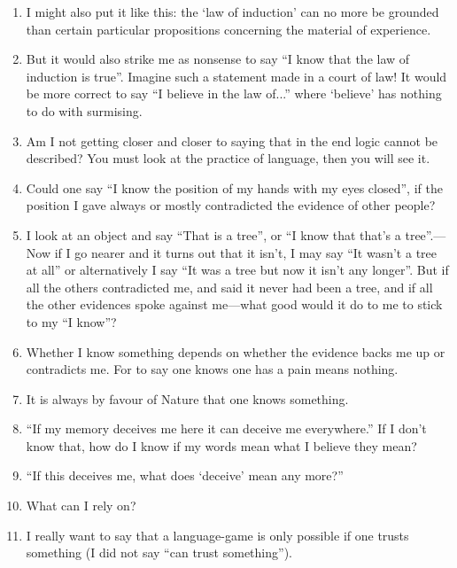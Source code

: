 \documentclass{book}
\begin{document}
\begin{enumerate}
\item
I might also put it like this: the `law of induction' can no more be grounded
than certain particular propositions concerning the material of experience.

\item
But it would also strike me as nonsense to say ``I know that the law of
induction is true''.  Imagine such a statement made in a court of law! It would
be more correct to say ``I believe in the law of...'' where `believe' has
nothing to do with surmising.

\item
Am I not getting closer and closer to saying that in the end logic cannot be
described? You must look at the practice of language, then you will see it.

\item
Could one say ``I know the position of my hands with my eyes closed'', if the
position I gave always or mostly contradicted the evidence of other people?

\item
I look at an object and say ``That is a tree'', or ``I know that that's a
tree''.---Now if I go nearer and it turns out that it isn't, I may say ``It
wasn't a tree at all'' or alternatively I say ``It was a tree but now it isn't
any longer''. But if all the others contradicted me, and said it never had been
a tree, and if all the other evidences spoke against me---what good would it do
to me to stick to my ``I know''?

\item
Whether I know something depends on whether the evidence backs me up or
contradicts me. For to say one knows one has a pain means nothing.

\item
It is always by favour of Nature that one knows something.

\item
``If my memory deceives me here it can deceive me everywhere.'' If I don't know
that, how do I know if my words mean what I believe they mean?

\item
``If this deceives me, what does `deceive' mean any more?''

\item
What can I rely on?

\item
I really want to say that a language-game is only possible if one trusts
something (I did not say ``can trust something'').


\end{enumerate}
\end{document}
